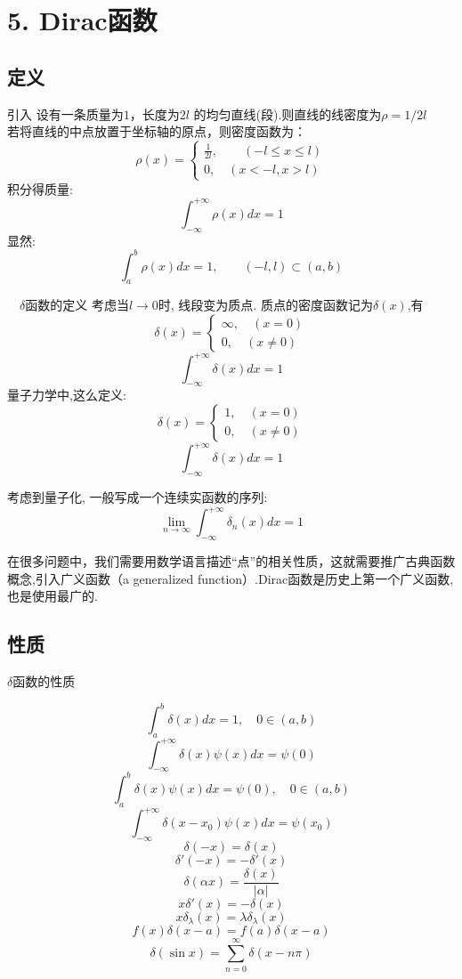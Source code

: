 
\section{5. Dirac函数}
\subsection{定义}

	  {引入}
	  {\Bullet}设有一条质量为$1$，长度为$2l$ 的均匀直线(段).则直线的线密度为$\rho=1/2l$\\
	  若将直线的中点放置于坐标轴的原点，则密度函数为： 
	  \[\rho(x)=\left\{\begin{array}{c}
		\frac{1}{2 l}, \qquad (-l \leq x \leq l) \\
		0, \quad (x<-l, x>l)
		\end{array}\right.\]
	 积分得质量:
	 \[\int_{-\infty}^{+\infty} \rho(x) d x= 1\]
	 显然:
	 \[\int_{a}^{b} \rho(x) d x =1, \qquad (-l,l) \subset (a,b) \]



	  {~~$\delta$函数的定义}	 
	{\Bullet} 考虑当$l \to 0$时, 线段变为质点. 质点的密度函数记为$\delta(x)$,有
	\[\delta(x)=\left\{\begin{array}{c}
		\infty, \quad(x=0) \\
		0, \quad(x \neq 0)
		\end{array}\right. \]
	\[\int_{-\infty}^{+\infty} \delta(x) d x=1 \]
	量子力学中,这么定义:
	\[\delta(x)=\left\{\begin{array}{c}
		1, \quad(x=0) \\
		0, \quad(x \neq 0)
		\end{array}\right. \]
	\[\int_{-\infty}^{+\infty} \delta(x) d x=1 \]



	  {}
	  考虑到量子化, 一般写成一个连续实函数的序列: 
	  \[\lim_{n\to\infty} \int_{-\infty}^{+\infty} \delta_n (x) d x=1 \]

	  {\Tips} 在很多问题中，我们需要用数学语言描述“点”的相关性质，这就需要推广古典函数概念,引入广义函数（a generalized function）.Dirac函数是历史上第一个广义函数,也是使用最广的.


\subsection{性质}

	{$\delta$函数的性质}

			\[\int_{a}^{b} \delta(x) d x=1 , \quad 0\in(a,b)\]
			\[\int_{-\infty}^{+\infty} \delta(x) \psi (x) d x=\psi  (0) \]
			\[\int_{a}^{b} \delta(x) \psi (x) d x=\psi (0)  , \quad 0\in(a,b)\]
			\[ \int_{-\infty}^{+\infty} \delta(x-x_0) \psi (x) d x=\psi  (x_0) \]
	  \[ \delta(-x)=\delta(x)\]
	  \[ \delta'( -x ) = - \delta'( x ) \]
	  \[ \delta(\alpha x ) = \frac{\delta( x ) }{\left|\alpha \right|} \]
	  \[ x\delta'( x ) = - \delta( x ) \]
	  \[ x\delta_{\lambda}( x ) = \lambda \delta_{\lambda}( x ) \]
	  \[ f(x)\delta( x-a ) = f(a)\delta( x-a ) \]
	  \[ \delta( \sin x ) = \sum_{n=0}^{\infty} \delta(x-n\pi)\]



